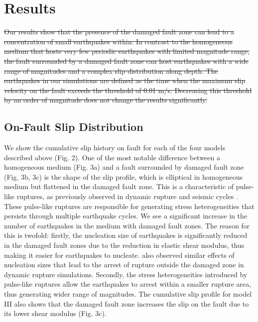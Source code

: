 \documentclass[11pt]{article}
\begin{document}
\section{Results}
\st{Our results show that the presence of the damaged fault zone can lead to a concentration of small earthquakes within. In contrast to the homogeneous medium that hosts very few periodic earthquakes with limited magnitude range, the fault surrounded by a damaged fault zone can host earthquakes with a wide range of magnitudes and a complex slip distribution along depth. The earthquakes in our simulations are defined as the time when the maximum slip velocity on the fault exceeds the threshold of 0.01 m/s. Decreasing this threshold by an order of magnitude does not change the results significantly.}

\subsection{On-Fault Slip Distribution}
We show the cumulative slip history on fault for each of the four models described above (Fig. 2). One of the most notable difference between a homogeneous medium (Fig. 3a) and a fault surrounded by damaged fault zone (Fig. 3b, 3c) is the shape of the slip profile, which is elliptical in homogeneous medium but flattened in the damaged fault zone. This is a characteristic of pulse-like ruptures, as previously observed in dynamic rupture \citep{harris_day_1997, huang_ampuero_2011, huang_2014} and seismic cycles \citep{michel_2017}. These pulse-like ruptures are responsible for generating stress heterogeneities that persists through multiple earthquake cycles. We see a significant increase in the number of earthquakes in the medium with damaged fault zones. The reason for this is twofold: firstly, the nucleation size of earthquakes is significantly reduced in the damaged fault zones due to the reduction in elastic shear modulus, thus making it easier for earthquakes to nucleate. \citet{huang_2018} also observed similar effects of nucleation sizes that lead to the arrest of rupture outside the damaged zone in dynamic rupture simulations. Secondly, the stress heterogeneities introduced by pulse-like ruptures allow the earthquakes to arrest within a smaller rupture area, thus generating wider range of magnitudes. The cumulative slip profile for model III  also shows that the damaged fault zone increases the slip on the fault due to its lower shear modulus (Fig. 3c).
\end{document}
